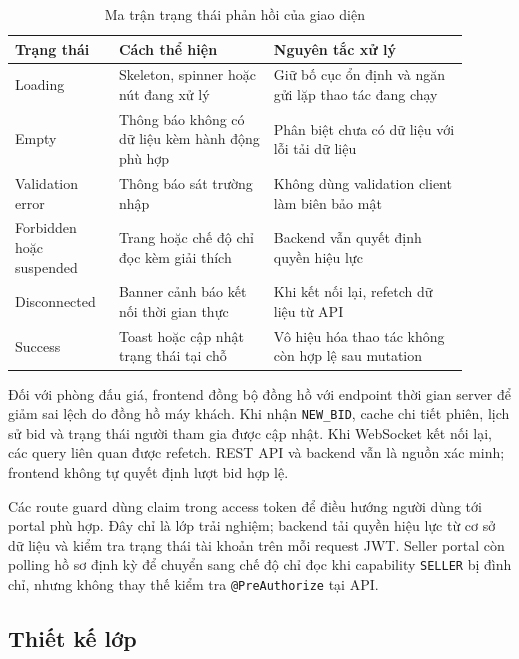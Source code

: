 \documentclass[../DoAn.tex]{subfiles}
\begin{document}
\begin{table}[H]
\centering
\small
\renewcommand{\arraystretch}{1.2}
\begin{tabular}{|>{\raggedright\arraybackslash}p{0.20\linewidth}|
                >{\raggedright\arraybackslash}p{0.31\linewidth}|
                >{\raggedright\arraybackslash}p{0.39\linewidth}|}
\hline
\textbf{Trạng thái} & \textbf{Cách thể hiện} & \textbf{Nguyên tắc xử lý} \\ \hline
Loading & Skeleton, spinner hoặc nút đang xử lý & Giữ bố cục ổn định và ngăn gửi lặp thao tác đang chạy \\ \hline
Empty & Thông báo không có dữ liệu kèm hành động phù hợp & Phân biệt chưa có dữ liệu với lỗi tải dữ liệu \\ \hline
Validation error & Thông báo sát trường nhập & Không dùng validation client làm biên bảo mật \\ \hline
Forbidden hoặc suspended & Trang hoặc chế độ chỉ đọc kèm giải thích & Backend vẫn quyết định quyền hiệu lực \\ \hline
Disconnected & Banner cảnh báo kết nối thời gian thực & Khi kết nối lại, refetch dữ liệu từ API \\ \hline
Success & Toast hoặc cập nhật trạng thái tại chỗ & Vô hiệu hóa thao tác không còn hợp lệ sau mutation \\ \hline
\end{tabular}
\caption{Ma trận trạng thái phản hồi của giao diện}
\label{tab:ui-state-matrix}
\end{table}

Đối với phòng đấu giá, frontend đồng bộ đồng hồ với endpoint thời gian server để giảm sai lệch do đồng hồ máy khách. Khi nhận \texttt{NEW\_BID}, cache chi tiết phiên, lịch sử bid và trạng thái người tham gia được cập nhật. Khi WebSocket kết nối lại, các query liên quan được refetch. REST API và backend vẫn là nguồn xác minh; frontend không tự quyết định lượt bid hợp lệ.

Các route guard dùng claim trong access token để điều hướng người dùng tới portal phù hợp. Đây chỉ là lớp trải nghiệm; backend tải quyền hiệu lực từ cơ sở dữ liệu và kiểm tra trạng thái tài khoản trên mỗi request JWT. Seller portal còn polling hồ sơ định kỳ để chuyển sang chế độ chỉ đọc khi capability \texttt{SELLER} bị đình chỉ, nhưng không thay thế kiểm tra \texttt{@PreAuthorize} tại API.

\FloatBarrier
\subsection{Thiết kế lớp}
\end{document}
